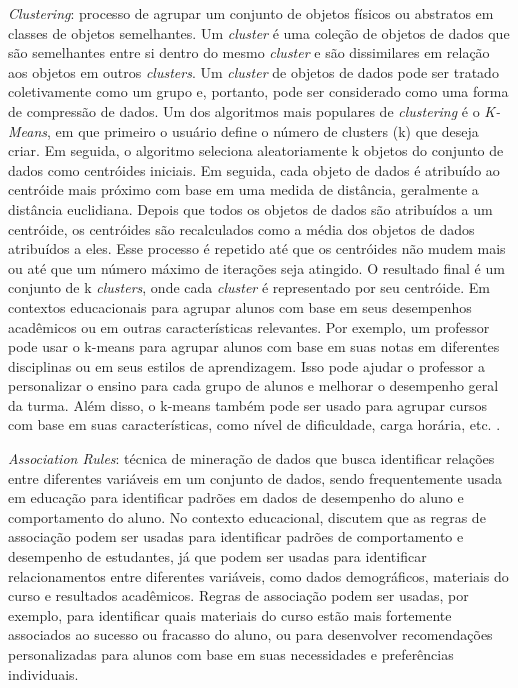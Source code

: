 \begin{enumerate}
    \item {\textit{Clustering}:  processo de agrupar um conjunto de objetos físicos ou abstratos em classes de objetos semelhantes. Um \textit{cluster} é uma coleção de objetos de dados que são semelhantes entre si dentro do mesmo \textit{cluster} e são dissimilares em relação aos objetos em outros \textit{clusters}. Um \textit{cluster} de objetos de dados pode ser tratado coletivamente como um grupo e, portanto, pode ser considerado como uma forma de compressão de dados. Um dos algoritmos mais populares de \textit{clustering} é o \textit{K-Means}, em que primeiro o usuário define o número de clusters (k) que deseja criar. Em seguida, o algoritmo seleciona aleatoriamente k objetos do conjunto de dados como centróides iniciais. Em seguida, cada objeto de dados é atribuído ao centróide mais próximo com base em uma medida de distância, geralmente a distância euclidiana. Depois que todos os objetos de dados são atribuídos a um centróide, os centróides são recalculados como a média dos objetos de dados atribuídos a eles. Esse processo é repetido até que os centróides não mudem mais ou até que um número máximo de iterações seja atingido. O resultado final é um conjunto de k \textit{clusters}, onde cada \textit{cluster} é representado por seu centróide. Em contextos educacionais para agrupar alunos com base em seus desempenhos acadêmicos ou em outras características relevantes. Por exemplo, um professor pode usar o k-means para agrupar alunos com base em suas notas em diferentes disciplinas ou em seus estilos de aprendizagem. Isso pode ajudar o professor a personalizar o ensino para cada grupo de alunos e melhorar o desempenho geral da turma. Além disso, o k-means também pode ser usado para agrupar cursos com base em suas características, como nível de dificuldade, carga horária, etc. \cite{Ali2017KMC}.

    \item \textit{Association Rules}: técnica de mineração de dados que busca identificar relações entre diferentes variáveis em um conjunto de dados, sendo frequentemente usada em educação para identificar padrões em dados de desempenho do aluno e comportamento do aluno. No contexto educacional,  discutem que as regras de associação podem ser usadas para identificar padrões de comportamento e desempenho de estudantes, já que podem ser usadas para identificar relacionamentos entre diferentes variáveis, como dados demográficos, materiais do curso e resultados acadêmicos. Regras de associação podem ser usadas, por exemplo, para identificar quais materiais do curso estão mais fortemente associados ao sucesso ou fracasso do aluno, ou para desenvolver recomendações personalizadas para alunos com base em suas necessidades e preferências individuais.

}
\end{enumerate}
